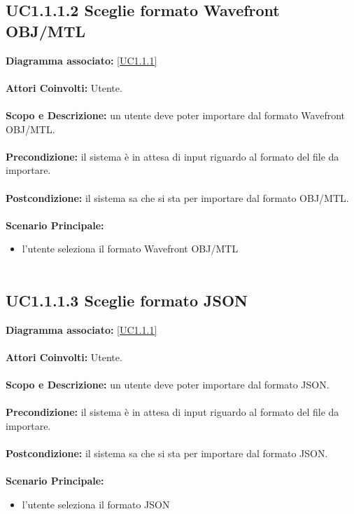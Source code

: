 \subsection{UC1.1.1.2 Sceglie formato Wavefront OBJ/MTL}
\textbf{Diagramma associato:}
\ref{UC1.1.1} \\ \\
\textbf{Attori Coinvolti:}
Utente. \\ \\
\textbf{Scopo e Descrizione:}
un utente deve poter importare dal formato Wavefront OBJ/MTL. \\ \\
\textbf{Precondizione:}
il sistema è in attesa di input riguardo al formato del file da importare. \\ \\
\textbf{Postcondizione:}
il sistema sa che si sta per importare dal formato OBJ/MTL. \\ \\
\textbf{Scenario Principale:}
\begin{itemize}
\item l'utente seleziona il formato Wavefront OBJ/MTL
\\ \\ \end{itemize}


\subsection{UC1.1.1.3 Sceglie formato JSON}
\textbf{Diagramma associato:}
\ref{UC1.1.1} \\ \\
\textbf{Attori Coinvolti:}
Utente. \\ \\
\textbf{Scopo e Descrizione:}
un utente deve poter importare dal formato JSON. \\ \\
\textbf{Precondizione:}
il sistema è in attesa di input riguardo al formato del file da importare. \\ \\
\textbf{Postcondizione:}
il sistema sa che si sta per importare dal formato JSON. \\ \\
\textbf{Scenario Principale:}
\begin{itemize}
\item l'utente seleziona il formato JSON
\\ \\ \end{itemize}


